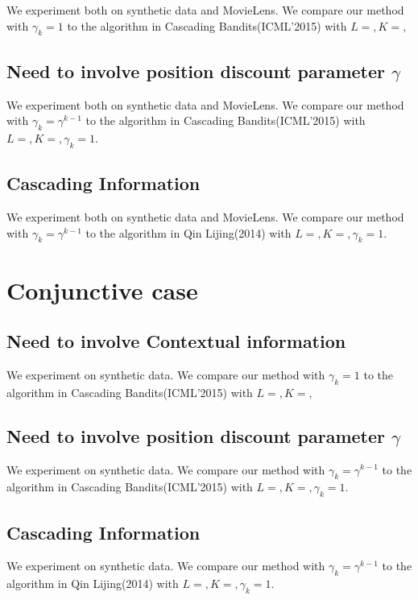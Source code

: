 \documentclass[a4paper,11pt]{article}
\begin{document}
We experiment both on synthetic data and MovieLens. We compare our method with $\gamma_k = 1$ to the algorithm in Cascading Bandits(ICML'2015) with $L= , K= ,$

\subsection{Need to involve position discount parameter $\gamma$}

We experiment both on synthetic data and MovieLens. We compare our method with $\gamma_k = \gamma^{k-1}$ to the algorithm in Cascading Bandits(ICML'2015) with $L= , K= , \gamma_k=1$.

\subsection{Cascading Information}

We experiment both on synthetic data and MovieLens. We compare our method with $\gamma_k = \gamma^{k-1}$ to the algorithm in Qin Lijing(2014) with $L= , K= , \gamma_k=1$.


\section{Conjunctive case}

\subsection{Need to involve Contextual information}

We experiment on synthetic data. We compare our method with $\gamma_k = 1$ to the algorithm in Cascading Bandits(ICML'2015) with $L= , K= ,$

\subsection{Need to involve position discount parameter $\gamma$}

We experiment on synthetic data. We compare our method with $\gamma_k = \gamma^{k-1}$ to the algorithm in Cascading Bandits(ICML'2015) with $L= , K= , \gamma_k=1$.

\subsection{Cascading Information}

We experiment on synthetic data. We compare our method with $\gamma_k = \gamma^{k-1}$ to the algorithm in Qin Lijing(2014) with $L= , K= , \gamma_k=1$.
\end{document}
